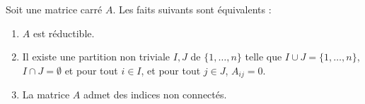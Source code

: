 \begin{proposition}      \label{PROPooZTYDooZAxQxF}
    Soit une matrice carré \( A\). Les faits suivants sont équivalents :
    \begin{enumerate}
        \item       \label{ITEMooYULAooVqgOnt}
            \( A\) est réductible.
        \item       \label{ITEMooNLVXooYSQKwO}
            Il existe une partition non triviale \( I,J\) de \( \{ 1,\ldots, n \}\) telle que \( I\cup J=\{ 1,\ldots, n \}\), \( I\cap J=\emptyset\) et pour tout \( i\in I\), et pour tout \( j\in J\), \( A_{ij}=0\).
        \item       \label{ITEMooVNOHooRUNpwG}
            La matrice \( A\) admet des indices non connectés.
    \end{enumerate}
\end{proposition}


